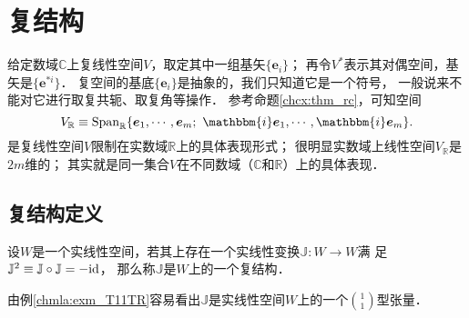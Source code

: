 \section{复结构}\label{chcx:sec_cpstru}
给定数域$\mathbb{C}$上复线性空间$V$，取定其中一组基矢$\{\boldsymbol{e}_i\}$；
再令$V^*$表示其对偶空间，基矢是$\{\boldsymbol{e}^{*i}\}$．
复空间的基底$\{\boldsymbol{e}_i\}$是抽象的，我们只知道它是一个符号，
一般说来不能对它进行取复共轭、取复角等操作．
参考命题\ref{chcx:thm_rc}，可知空间
\begin{equation}\label{chcx:eqn_VR}
    V_{\mathbb{R}} \equiv {\rm Span}_{\mathbb{R}}\{\boldsymbol{e}_1,\cdots,\boldsymbol{e}_m;\  
    \mathbbm{i}\boldsymbol{e}_1,\cdots,\mathbbm{i}\boldsymbol{e}_m\} .
\end{equation}
是复线性空间$V$限制在实数域$\mathbb{R}$上的具体表现形式；
很明显实数域上线性空间$V_{\mathbb{R}}$是$2m$维的；
其实就是同一集合$V$在不同数域（$\mathbb{C}$和$\mathbb{R}$）上的具体表现．

\subsection{复结构定义}



\begin{definition}
    设$W$是一个实线性空间，若其上存在一个实线性变换$\mathbb{J}:W\to W$满
    足$\mathbb{J}^2\equiv \mathbb{J}\circ \mathbb{J}=-{\rm id}$，
    那么称$\mathbb{J}$是$W$上的一个{\heiti 复结构}．
\end{definition}
由例\ref{chmla:exm_T11TR}容易看出$\mathbb{J}$是实线性空间$W$上的一个$\binom{1}{1}$型张量．


